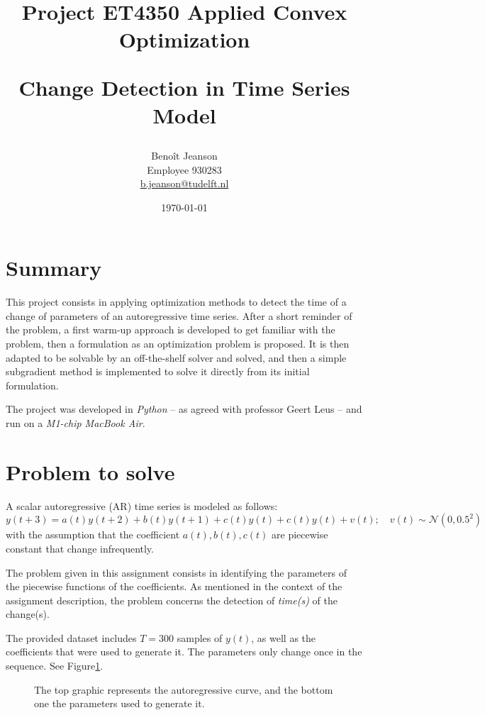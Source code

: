 \documentclass[11pt]{article}
\title{Project ET4350 Applied Convex Optimization

Change Detection in Time Series Model}
\author{Benoît Jeanson \\ Employee 930283 \\ \href{mailto:b.jeanson@tudelft.nl}{b.jeanson@tudelft.nl}}
\date{\today}
\begin{document}
\maketitle
\pagebreak



\section{Summary}
    This project consists in applying optimization methods to detect the time of a change of parameters of an autoregressive time series. After a short reminder of the problem, a first warm-up approach is developed to get familiar with the problem, then a formulation as an optimization problem is proposed. It is then adapted to be solvable by an off-the-shelf solver and solved, and then a simple subgradient method is implemented to solve it directly from its initial formulation.
    
    The project was developed in \emph{Python} -- as agreed with professor Geert Leus -- and run on a \emph{M1-chip MacBook Air}.

\section{Problem to solve}
    A scalar autoregressive (AR) time series is modeled as follows:
    $$y(t+3) = a(t)y(t+2) + b(t)y(t+1) + c(t)y(t) + c(t)y(t) + v(t); \quad v(t) \sim \mathcal{N}(0,0.5^2)$$
    with the assumption that the coefficient $a(t), b(t), c(t)$ are piecewise constant that change infrequently.

    The problem given in this assignment consists in identifying the parameters of the piecewise functions of the coefficients. As mentioned in the context of the assignment description, the problem concerns the detection of \emph{time(s)} of the change(s).

    The provided dataset includes $T=300$ samples of $y(t)$, as well as the coefficients that were used to generate it. The parameters only change once in the sequence. See Figure\ref{fig:dataset}.

    \begin{figure}[h]
        \centering
        
        \caption{\label{fig:dataset} The top graphic represents the autoregressive curve, and the bottom one the parameters used to generate it.}
    \end{figure}
\end{document}

